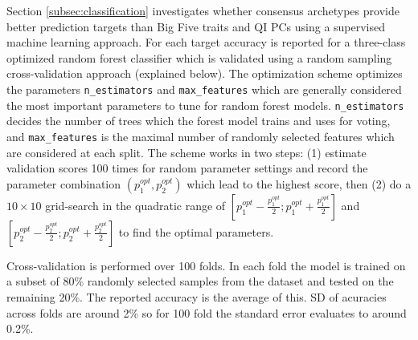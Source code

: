 Section \ref{subsec:classification} investigates whether consensus archetypes provide better prediction targets than Big Five traits and QI PCs using a supervised machine learning approach. For each target accuracy is reported for a three-class optimized random forest classifier which is validated using a random sampling cross-validation approach (explained below). The optimization scheme optimizes the parameters \texttt{n\_estimators} and \texttt{max\_features} which are generally considered the most important parameters to tune for random forest models. \texttt{n\_estimators} decides the number of trees which the forest model trains and uses for voting, and \texttt{max\_features} is the maximal number of randomly selected features which are considered at each split. The scheme works in two steps: (1) estimate validation scores 100 times for random parameter settings and record the parameter combination $(p_1^{opt},p_2^{opt})$ which lead to the highest score, then (2) do a $10 \times 10$ grid-search in the quadratic range of $[p_1^{opt}-\frac{p_1^{opt}}{2}; p_1^{opt}+\frac{p_1^{opt}}{2}]$ and $[p_2^{opt}-\frac{p_2^{opt}}{2}; p_2^{opt}+\frac{p_2^{opt}}{2}]$ to find the optimal parameters.

Cross-validation is performed over 100 folds. In each fold the model is trained on a subset of 80\% randomly selected samples from the dataset and tested on the remaining 20\%. The reported accuracy is the average of this. SD of acuracies across folds are around 2\% so for 100 fold the standard error evaluates to around 0.2\%.


